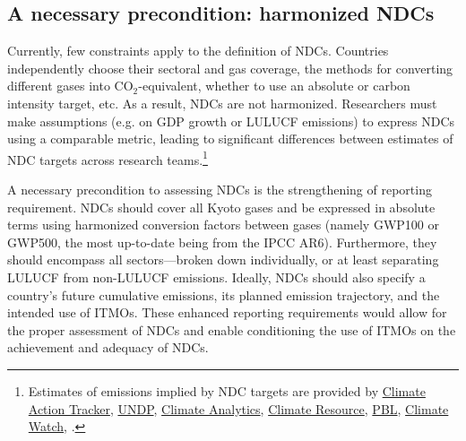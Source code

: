 \documentclass[12pt,english]{article}
\begin{document}
\subsection{A necessary precondition: harmonized NDCs} %
Currently, few constraints apply to the definition of NDCs. Countries independently choose their sectoral and gas coverage, the methods for converting different gases into CO$_\text{2}$-equivalent, whether to use an absolute or carbon intensity target, etc. As a result, NDCs are not harmonized. Researchers must make assumptions (e.g. on GDP growth or LULUCF emissions) to express NDCs using a comparable metric, leading to significant differences between estimates of NDC targets across research teams.\footnote{Estimates of emissions implied by NDC targets are provided by \href{https://climateactiontracker.org/}{Climate Action Tracker}, \href{https://www.climateandforests-undp.org/plant}{UNDP}, \href{https://1p5ndc-pathways.climateanalytics.org/}{Climate Analytics}, \href{https://www.climate-resource.com/tools/ndcs}{Climate Resource}, \href{https://zenodo.org/records/10875617}{PBL}, \href{https://www.climatewatchdata.org/}{Climate Watch}, \cite{nascimento_comparing_2024,den_elzen_updated_2022,unep_emissions_2025}.} %

A necessary precondition to assessing NDCs is the strengthening of reporting requirement. NDCs should cover all Kyoto gases and be expressed in absolute terms using harmonized conversion factors between gases (namely GWP100 or GWP500, the most up-to-date being from the IPCC AR6). Furthermore, they should encompass all sectors---broken down individually, or at least separating LULUCF from non-LULUCF emissions. Ideally, NDCs should also specify a country's future cumulative emissions, its planned emission trajectory, and the intended use of ITMOs. These enhanced reporting requirements would allow for the proper assessment of NDCs and enable conditioning the use of ITMOs on the achievement and adequacy of NDCs. 
\end{document}
